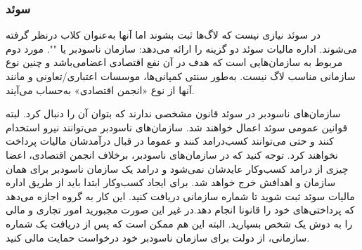 \subsubsection{سوئد}
در سوئد نیازی نیست که لاگ‌ها ثبت بشوند اما آنها به‌عنوان کلاب
درنظر گرفته می‌شوند. اداره مالیات سوئد دو گزینه را ارائه می‌دهد:
سازمان ناسودبر یا
"".
مورد دوم مربوط به سازمان‌هایی
است که هدف در آن نفع اقتصادی اعضامی‌باشد و چنین نوع سازمانی مناسب
لاگ نیست. به‌طور سنتی کمپانی‌ها، موسسات اعتباری/تعاونی و مانند آنها
از نوع «انجمن اقتصادی» به‌حساب می‌آیند.

سازمان‌های ناسودبر در سوئد قانون مشخصی ندارند که بتوان آن را دنبال کرد.
لبته قوانین عمومی سوئد اعمال خواهند شد. سازمان‌های ناسودبر می‌توانند نیرو
استخدام کنند و حتی می‌توانند کسب‌درامد کنند و عموما در قبال درآمدشان مالیات
پرداخت نخواهند کرد. توجه کنید که در سازمان‌های ناسودبر، برخلاف انجمن اقتصادی،
اعضا چیزی از درامد کسب‌وکار عایدشان نمی‌شود و درامد یک سازمان ناسودبر برای همان
سازمان و اهدافش خرج خواهد شد.
برای ایجاد کسب‌وکار ابتدا باید از طریق اداره مالیات سوئد ثبت شوید تا
شماره سازمانی دریافت کنید. این کار به گروه اجازه می‌دهد که پرداختی‌های خود را
قانونا انجام دهد.در غیر این صورت مجبورید امور تجاری و مالی را به دوش یک شخص
بسپارید.
البته این هم ممکن است که پس از دریافت یک شماره سازمانی، از دولت برای سازمان
ناسودبر خود درخواست حمایت مالی کنید.

